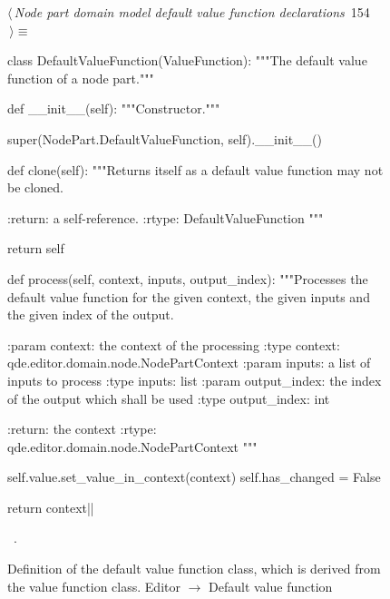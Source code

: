 \documentclass[%
    a4paper,    %
    justified,  %
    nobib,      %
    openany     %
]{tufte-book}
\makeatletter
\renewcommand{\label}[1]{\@tufte@label{##1}}%
\makeatother
\begin{document}
\begin{figure}[!htbp]
\begin{flushleft} \small
\begin{minipage}{\linewidth}\label{scrap113}\raggedright\small
{} $\langle\,${\itshape Node part domain model default value function declarations}\nobreak\ {\footnotesize {154}}$\,\rangle\equiv$
\vspace{-1ex}
\begin{pythoncode}
class DefaultValueFunction(ValueFunction):
    """The default value function of a node part."""

    def __init__(self):
        """Constructor."""

        super(NodePart.DefaultValueFunction, self).__init__()

    def clone(self):
        """Returns itself as a default value function may not
        be cloned.

        :return: a self-reference.
        :rtype: DefaultValueFunction
        """

        return self

    def process(self, context, inputs, output_index):
        """Processes the default value function for the given
        context, the given inputs and the given index of the
        output.

        :param context: the context of the processing
        :type  context: qde.editor.domain.node.NodePartContext
        :param inputs: a list of inputs to process
        :type inputs: list
        :param output_index: the index of the output which shall
                             be used
        :type output_index: int

        :return: the context
        :rtype:  qde.editor.domain.node.NodePartContext
        """

        self.value.set_value_in_context(context)
        self.has_changed = False

        return context|\NWsep|
\end{pythoncode}
\vspace{1.5ex}
\footnotesize
\begin{list}{}{\setlength{\itemsep}{-\parsep}\setlength{\itemindent}{-\leftmargin}}
\item \NWtxtMacroRefIn\ .

\item{}
\end{list}
\end{minipage}\vspace{4ex}
\end{flushleft}
\caption{Definition of the default value function class, which is derived from
  the value function class.
  \newline{}\newline{}Editor $\rightarrow$ Default value function}
\end{figure}
\end{document}
